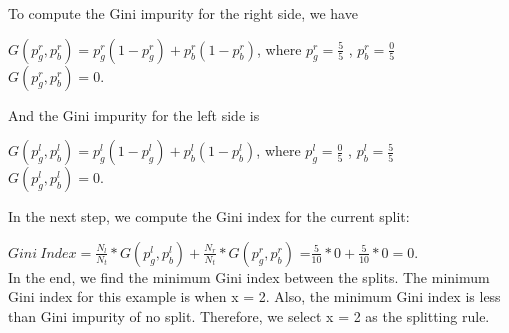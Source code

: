 To compute the Gini impurity for the right side, we have

$G(p_g^{r},p_b^{r})=  p_{g}^{r}(1- p_{g}^{r}) + p_{b}^{r}(1-p_{b}^{r})$, where  $p_{g}^{r} = \frac{5}{5}$ ,  $p_{b}^{r} = \frac{0}{5}$  \\
$G(p_g^{r},p_b^{r}) = 0.$


And the Gini impurity for the left side is

$G(p_g^{l},p_b^{l}) =  p_{g}^{l}(1- p_{g}^{l}) + p_{b}^{l}(1-p_{b}^{l})$, where  $p_{g}^{l} = \frac{0}{5}$ ,  $p_{b}^{l} = \frac{5}{5}$ \\ 
$G(p_g^{l},p_b^{l}) = 0.$

In the next step, we compute the Gini index for the current split:
 
 $Gini\: Index = \frac{N_{l}}{N_{t}}*G(p_g^{l},p_b^{l}) + \frac{N_{r}}{N_{t}}*G(p_g^{r},p_b^{r})$  =$ \frac{5}{10}*0 + \frac{5}{10}*0 = 0.$ \\

In the end, we find the minimum Gini index between the splits. The minimum Gini index for this example is when x = 2. Also, the minimum Gini index is less than Gini impurity of no split. Therefore, we select x = 2 as the splitting rule.








